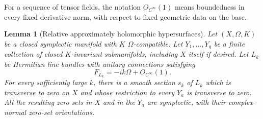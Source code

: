 \documentclass[11pt]{article}
\newtheorem{lemma}[theorem]{Lemma}
\theoremstyle{definition}
\theoremstyle{remark}
\begin{document}
For a sequence of tensor fields, the notation $O_{C^\infty}(1)$
means boundedness in every fixed derivative norm, with respect to
fixed geometric data on the base.

\begin{lemma}[Relative approximately holomorphic hypersurfaces]
\label{lem:relative-AH}
Let $(X,\Omega,K)$ be a closed symplectic manifold with $K$
$\Omega$-compatible.  Let $Y_1,\ldots,Y_q$ be a finite collection
of closed $K$-invariant submanifolds, including $X$ itself if
desired.  Let $L_k$ be Hermitian line bundles with unitary
connections satisfying
\[
F_{L_k}=-ik\Omega+O_{C^\infty}(1).
\]
For every sufficiently large $k$, there is a smooth section $s_k$
of $L_k$ which is transverse to zero on $X$ and whose restriction
to every $Y_a$ is transverse to zero.  All the resulting zero
sets in $X$ and in the $Y_a$ are symplectic, with their
complex-normal zero-set orientations.
\end{lemma}
\end{document}
